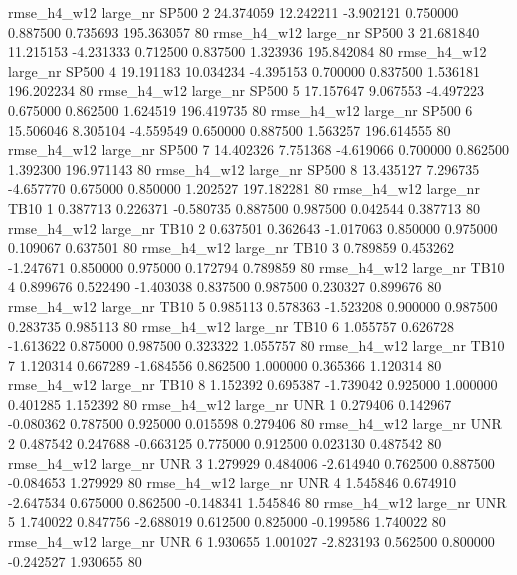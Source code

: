  rmse_h4_w12   large_nr    SP500                 2 24.374059 12.242211  -3.902121 0.750000 0.887500  0.735693  195.363057 80
 rmse_h4_w12   large_nr    SP500                 3 21.681840 11.215153  -4.231333 0.712500 0.837500  1.323936  195.842084 80
 rmse_h4_w12   large_nr    SP500                 4 19.191183 10.034234  -4.395153 0.700000 0.837500  1.536181  196.202234 80
 rmse_h4_w12   large_nr    SP500                 5 17.157647  9.067553  -4.497223 0.675000 0.862500  1.624519  196.419735 80
 rmse_h4_w12   large_nr    SP500                 6 15.506046  8.305104  -4.559549 0.650000 0.887500  1.563257  196.614555 80
 rmse_h4_w12   large_nr    SP500                 7 14.402326  7.751368  -4.619066 0.700000 0.862500  1.392300  196.971143 80
 rmse_h4_w12   large_nr    SP500                 8 13.435127  7.296735  -4.657770 0.675000 0.850000  1.202527  197.182281 80
 rmse_h4_w12   large_nr     TB10                 1  0.387713  0.226371  -0.580735 0.887500 0.987500  0.042544    0.387713 80
 rmse_h4_w12   large_nr     TB10                 2  0.637501  0.362643  -1.017063 0.850000 0.975000  0.109067    0.637501 80
 rmse_h4_w12   large_nr     TB10                 3  0.789859  0.453262  -1.247671 0.850000 0.975000  0.172794    0.789859 80
 rmse_h4_w12   large_nr     TB10                 4  0.899676  0.522490  -1.403038 0.837500 0.987500  0.230327    0.899676 80
 rmse_h4_w12   large_nr     TB10                 5  0.985113  0.578363  -1.523208 0.900000 0.987500  0.283735    0.985113 80
 rmse_h4_w12   large_nr     TB10                 6  1.055757  0.626728  -1.613622 0.875000 0.987500  0.323322    1.055757 80
 rmse_h4_w12   large_nr     TB10                 7  1.120314  0.667289  -1.684556 0.862500 1.000000  0.365366    1.120314 80
 rmse_h4_w12   large_nr     TB10                 8  1.152392  0.695387  -1.739042 0.925000 1.000000  0.401285    1.152392 80
 rmse_h4_w12   large_nr      UNR                 1  0.279406  0.142967  -0.080362 0.787500 0.925000  0.015598    0.279406 80
 rmse_h4_w12   large_nr      UNR                 2  0.487542  0.247688  -0.663125 0.775000 0.912500  0.023130    0.487542 80
 rmse_h4_w12   large_nr      UNR                 3  1.279929  0.484006  -2.614940 0.762500 0.887500 -0.084653    1.279929 80
 rmse_h4_w12   large_nr      UNR                 4  1.545846  0.674910  -2.647534 0.675000 0.862500 -0.148341    1.545846 80
 rmse_h4_w12   large_nr      UNR                 5  1.740022  0.847756  -2.688019 0.612500 0.825000 -0.199586    1.740022 80
 rmse_h4_w12   large_nr      UNR                 6  1.930655  1.001027  -2.823193 0.562500 0.800000 -0.242527    1.930655 80
